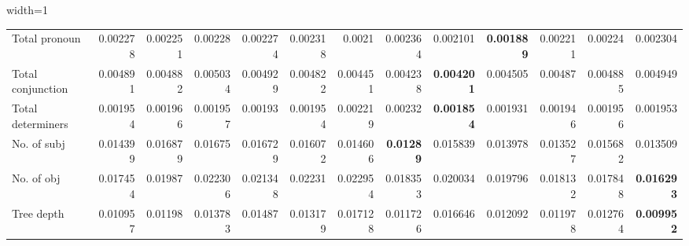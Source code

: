 \documentclass[sigconf]{acmart}
\newcommand{\wv}{wav2vec2.0\xspace}
\begin{document}
\begin{table*}[]
\begin{adjustbox}{width=1\textwidth}
\begin{tabular}{@{}l|rrrrrrrrrrrr@{}}
Total pronoun                  & 0.002278 & 0.002251 & 0.00228  & 0.002274 & 0.002318          & 0.0021            & 0.002364          & 0.002101          & \textbf{0.001889} & 0.002211 & 0.00224  & 0.002304          \\
Total conjunction              & 0.004891 & 0.004882 & 0.005034 & 0.004929 & 0.004822          & 0.004451          & 0.004238          & \textbf{0.004201} & 0.004505          & 0.00487  & 0.004885 & 0.004949          \\
Total determiners              & 0.001954 & 0.001966 & 0.001957 & 0.00193  & 0.001954          & 0.002219          & 0.00232           & \textbf{0.001854} & 0.001931          & 0.001946 & 0.001956 & 0.001953          \\
No. of subj                    & 0.014399 & 0.016879 & 0.01675  & 0.016729 & 0.016072          & 0.014606          & \textbf{0.01289}  & 0.015839          & 0.013978          & 0.013527 & 0.015682 & 0.013509          \\
No. of obj                     & 0.017454 & 0.01987  & 0.022306 & 0.021348 & 0.02231           & 0.022954          & 0.018353          & 0.020034          & 0.019796          & 0.018132 & 0.017848 & \textbf{0.016293} \\
Tree depth                     & 0.010957 & 0.01198  & 0.013783 & 0.01487  & 0.013179          & 0.017128          & 0.011726          & 0.016646          & 0.012092          & 0.011978 & 0.012764 & \textbf{0.009952}\\ \bottomrule
\end{tabular}
\end{adjustbox}
\vspace{1 mm}
\caption{\label{Vocab_M} \small  Results (MSE) for text features on {\wv} for native read speech corpus (Librispeech)}
\end{table*}
\end{document}
